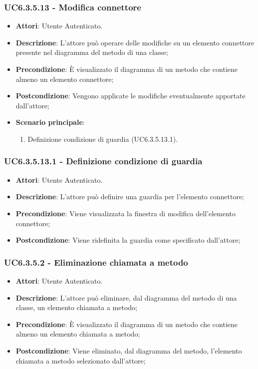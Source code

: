 \subsubsection{UC6.3.5.13 - Modifica connettore} 
\label{sssec:UC6.3.5.13} 
\begin{itemize} 
\item \textbf{Attori}: Utente Autenticato.
\item \textbf{Descrizione}: L'attore può operare delle modifiche su un elemento connettore presente nel diagramma del metodo di una classe;
\item \textbf{Precondizione}: È visualizzato il diagramma di un metodo che contiene almeno un elemento connettore;
\item \textbf{Postcondizione}: Vengono applicate le modifiche eventualmente apportate dall'attore;
\item \textbf{Scenario principale}: \begin{enumerate}\item Definizione condizione di guardia (UC6.3.5.13.1). 
 \end{enumerate}
\end{itemize} 
\subsubsection{UC6.3.5.13.1 - Definizione condizione di guardia} 
\label{sssec:UC6.3.5.13.1} 
\begin{itemize} 
\item \textbf{Attori}: Utente Autenticato.
\item \textbf{Descrizione}: L'attore può definire una guardia per l'elemento connettore;
\item \textbf{Precondizione}: Viene visualizzata la finestra di modifica dell'elemento connettore;
\item \textbf{Postcondizione}: Viene ridefinita la guardia come specificato dall'attore;
\end{itemize} 
\subsubsection{UC6.3.5.2 - Eliminazione chiamata a metodo} 
\label{sssec:UC6.3.5.2} 
\begin{itemize} 
\item \textbf{Attori}: Utente Autenticato.
\item \textbf{Descrizione}: L'attore può eliminare, dal diagramma del metodo di una classe, un elemento chiamata a metodo;
\item \textbf{Precondizione}: È visualizzato il diagramma di un metodo che contiene almeno un elemento chiamata a metodo;
\item \textbf{Postcondizione}: Viene eliminato, dal diagramma del metodo,  l'elemento chiamata a metodo selezionato dall'attore;
\end{itemize} 
